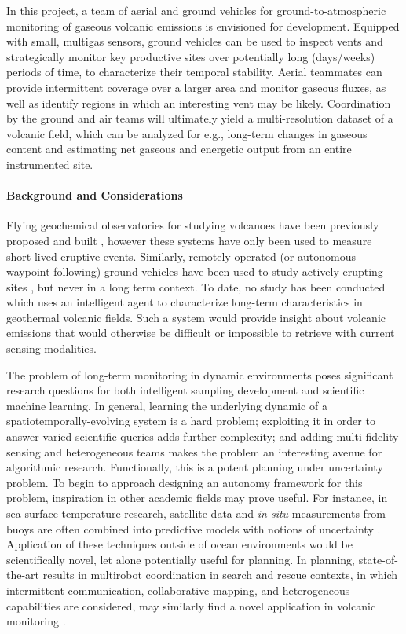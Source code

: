 In this project, a team of aerial and ground vehicles for ground-to-atmospheric monitoring of gaseous volcanic emissions is envisioned for development. Equipped with small, multigas sensors, ground vehicles can be used to inspect vents and strategically monitor key productive sites over potentially long (days/weeks) periods of time, to characterize their temporal stability. Aerial teammates can provide intermittent coverage over a larger area and monitor gaseous fluxes, as well as identify regions in which an interesting vent may be likely. Coordination by the ground and air teams will ultimately yield a multi-resolution dataset of a volcanic field, which can be analyzed for e.g., long-term changes in gaseous content and estimating net gaseous and energetic output from an entire instrumented site.

\paragraph{Background and Considerations}
Flying geochemical observatories for studying volcanoes have been previously proposed and built \autocite{mcgonigle2008unmanned,stix2018using,xi2016constraining,galle2021multi}, however these systems have only been used to measure short-lived eruptive events.
Similarly, remotely-operated (or autonomous waypoint-following) ground vehicles have been used to study actively erupting sites \autocite{muscato2012volcanic}, but never in a long term context.
To date, no study has been conducted which uses an intelligent agent to characterize long-term characteristics in geothermal volcanic fields.
Such a system would provide insight about volcanic emissions that would otherwise be difficult or impossible to retrieve with current sensing modalities.

The problem of long-term monitoring in dynamic environments poses significant research questions for both intelligent sampling development and scientific machine learning. In general, learning the underlying dynamic of a spatiotemporally-evolving system is a hard problem; exploiting it in order to answer varied scientific queries adds further complexity; and adding multi-fidelity sensing and heterogeneous teams makes the problem an interesting avenue for algorithmic research.
Functionally, this is a potent planning under uncertainty problem.
To begin to approach designing an autonomy framework for this problem, inspiration in other academic fields may prove useful. For instance, in sea-surface temperature research, satellite data and \emph{in situ} measurements from buoys are often combined into predictive models with notions of uncertainty \autocite{babaee2020multifidelity}. Application of these techniques outside of ocean environments would be scientifically novel, let alone potentially useful for planning. In planning, state-of-the-art results in multirobot coordination in search and rescue contexts, in which intermittent communication, collaborative mapping, and heterogeneous capabilities are considered, may similarly find a novel application in volcanic monitoring \autocite{rizk2019cooperative,queralta2020collaborative}.



